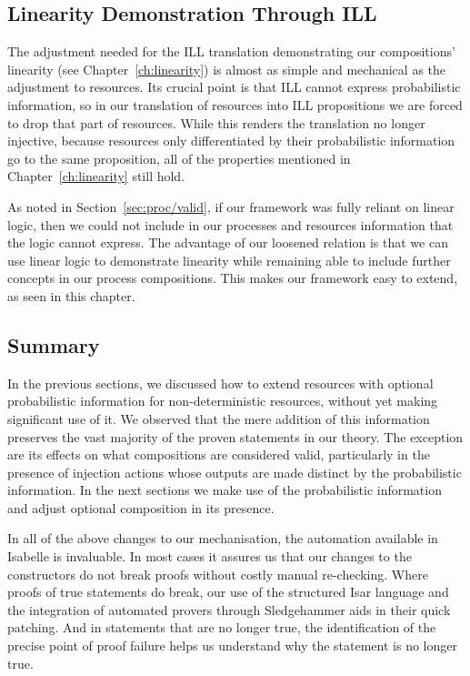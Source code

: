 \documentclass[class=smolathesis,crop=false]{standalone}
\begin{document}
\subsection{Linearity Demonstration Through ILL}
\label{sec:prob/add-prob-info/ill}

The adjustment needed for the ILL translation demonstrating our compositions' linearity (see Chapter~\ref{ch:linearity}) is almost as simple and mechanical as the adjustment to resources.
Its crucial point is that ILL cannot express probabilistic information, so in our translation of resources into ILL propositions we are forced to drop that part of  resources.
While this renders the translation no longer injective, because resources only differentiated by their probabilistic information go to the same proposition, all of the properties mentioned in Chapter~\ref{ch:linearity} still hold.

As noted in Section~\ref{sec:proc/valid}, if our framework was fully reliant on linear logic, then we could not include in our processes and resources information that the logic cannot express.
The advantage of our loosened relation is that we can use linear logic to demonstrate linearity while remaining able to include further concepts in our process compositions.
This makes our framework easy to extend, as seen in this chapter.

\subsection{Summary}

In the previous sections, we discussed how to extend resources with optional probabilistic information for non-deterministic resources, without yet making significant use of it.
We observed that the mere addition of this information preserves the vast majority of the proven statements in our theory.
The exception are its effects on what compositions are considered valid, particularly in the presence of injection actions whose outputs are made distinct by the probabilistic information.
In the next sections we make use of the probabilistic information and adjust optional composition in its presence.

In all of the above changes to our mechanisation, the automation available in Isabelle is invaluable.
In most cases it assures us that our changes to the constructors do not break proofs without costly manual re-checking.
Where proofs of true statements do break, our use of the structured Isar language and the integration of automated provers through Sledgehammer aids in their quick patching.
And in statements that are no longer true, the identification of the precise point of proof failure helps us understand why the statement is no longer true.
\end{document}
